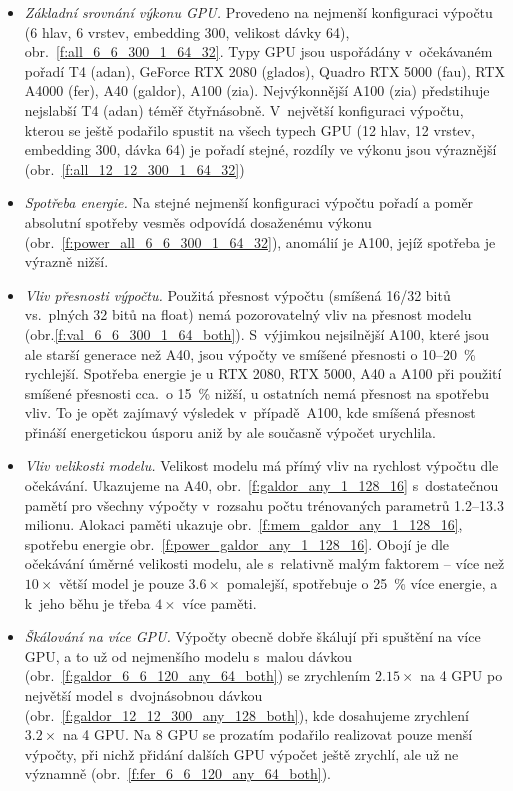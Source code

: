 \documentclass[a4paper,11pt]{article}
\begin{document}
\begin{itemize}
\item \emph{Základní srovnání výkonu GPU.} Provedeno na nejmenší konfiguraci
výpočtu (6 hlav, 6 vrstev, embedding 300, velikost dávky 64),
obr.~\ref{f:all_6_6_300_1_64_32}. 
Typy GPU jsou uspořádány v~očekávaném pořadí
T4 (adan), GeForce RTX 2080 (glados), Quadro RTX 5000 (fau), RTX A4000 (fer), A40
(galdor), A100 (zia).
Nejvýkonnější A100 (zia) předstihuje nejslabší T4 (adan) téměř čtyřnásobně.  
V~největší konfiguraci výpočtu, kterou se ještě podařilo spustit na všech typech GPU (12 hlav, 12 vrstev, embedding 300, dávka 64) je pořadí stejné, rozdíly ve výkonu jsou výraznější (obr.~\ref{f:all_12_12_300_1_64_32})

\item \emph{Spotřeba energie.} Na stejné nejmenší konfiguraci výpočtu pořadí a poměr absolutní spotřeby vesměs
odpovídá dosaženému výkonu (obr.~\ref{f:power_all_6_6_300_1_64_32}), anomálií je A100, jejíž spotřeba je výrazně nižší.

\item \emph{Vliv přesnosti výpočtu.} Použitá přesnost výpočtu (smíšená 16/32 bitů vs.\ plných 32 bitů na float)
nemá pozorovatelný vliv na přesnost modelu (obr.\ref{f:val_6_6_300_1_64_both}).
S~výjimkou nejsilnější A100, které jsou ale starší generace než A40, jsou výpočty ve smíšené přesnosti o 10--20~\% rychlejší.
Spotřeba energie je u RTX 2080, RTX 5000, A40 a A100 při použití smíšené přesnosti cca.\ o 15~\% nižší, u ostatních nemá
přesnost na spotřebu vliv.
To je opět zajímavý výsledek v~případě~A100, kde smíšená přesnost přináší energetickou úsporu aniž by ale současně
výpočet urychlila.

\item \emph{Vliv velikosti modelu.}
Velikost modelu má přímý vliv na rychlost výpočtu dle očekávání. Ukazujeme na A40, obr.~\ref{f:galdor_any_1_128_16}
s~dostatečnou pamětí pro všechny výpočty v~rozsahu počtu trénovaných parametrů 1.2--13.3 milionu.
Alokaci paměti ukazuje obr.~\ref{f:mem_galdor_any_1_128_16}, spotřebu energie obr.~\ref{f:power_galdor_any_1_128_16}.
Obojí je dle očekávání úměrné velikosti modelu, ale s~relativně malým faktorem -- více než $10\times$ větší model je pouze
$3.6\times$ pomalejší, spotřebuje o 25~\% více energie, a k~jeho běhu je třeba $4\times$ více paměti.

\item \emph{Škálování na více GPU.}
Výpočty obecně dobře škálují při spuštění na více GPU, a to už od nejmenšího modelu s~malou dávkou (obr.~\ref{f:galdor_6_6_120_any_64_both}) se zrychlením $2.15\times$ na 4 GPU
po největší model s~dvojnásobnou dávkou (obr.~\ref{f:galdor_12_12_300_any_128_both}), kde dosahujeme zrychlení $3.2\times$ na 4 GPU.
Na 8 GPU se prozatím podařilo realizovat pouze menší výpočty, při nichž přidání dalších GPU výpočet ještě zrychlí,
ale už ne významně (obr.~\ref{f:fer_6_6_120_any_64_both}).
\end{itemize}
\end{document}
